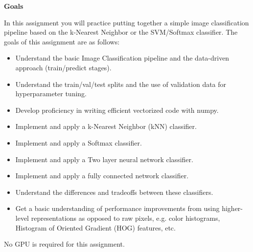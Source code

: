 \textbf{Goals}

In this assignment you will practice putting together a simple image classification pipeline based on the k-Nearest Neighbor or the SVM/Softmax classifier. 
The goals of this assignment are as follows:

\begin{itemize}
    \item Understand the basic Image Classification pipeline and the data-driven approach (train/predict stages).
    \item Understand the train/val/test splits and the use of validation data for hyperparameter tuning.
    \item Develop proficiency in writing efficient vectorized code with numpy.
    \item Implement and apply a k-Nearest Neighbor (kNN) classifier.
    \item Implement and apply a Softmax classifier.
    \item Implement and apply a Two layer neural network classifier.
    \item Implement and apply a fully connected network classifier.
    \item Understand the differences and tradeoffs between these classifiers.
    \item Get a basic understanding of performance improvements from using higher-level representations as opposed to raw pixels, e.g. color histograms, Histogram of Oriented Gradient (HOG) features, etc.
\end{itemize}


No GPU is required for this assignment.

\newpage